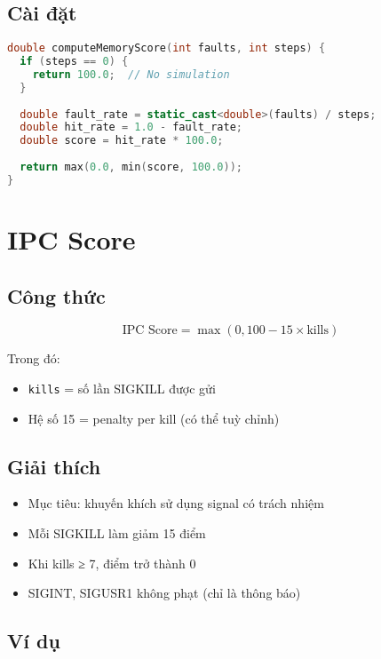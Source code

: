 \subsection{Cài đặt}

\begin{lstlisting}[language=C++,caption={Memory Score Computation}]
double computeMemoryScore(int faults, int steps) {
  if (steps == 0) {
    return 100.0;  // No simulation
  }
  
  double fault_rate = static_cast<double>(faults) / steps;
  double hit_rate = 1.0 - fault_rate;
  double score = hit_rate * 100.0;
  
  return max(0.0, min(score, 100.0));
}
\end{lstlisting}

\section{IPC Score}

\subsection{Công thức}

\begin{equation}
\text{IPC Score} = \max\left(0, 100 - 15 \times \text{kills}\right)
\end{equation}

Trong đó:
\begin{itemize}[leftmargin=1.5cm]
  \item \texttt{kills} = số lần SIGKILL được gửi
  \item Hệ số 15 = penalty per kill (có thể tuỳ chỉnh)
\end{itemize}

\subsection{Giải thích}

\begin{itemize}[leftmargin=1.5cm]
  \item Mục tiêu: khuyến khích sử dụng signal có trách nhiệm
  \item Mỗi SIGKILL làm giảm 15 điểm
  \item Khi kills ≥ 7, điểm trở thành 0
  \item SIGINT, SIGUSR1 không phạt (chỉ là thông báo)
\end{itemize}

\subsection{Ví dụ}

